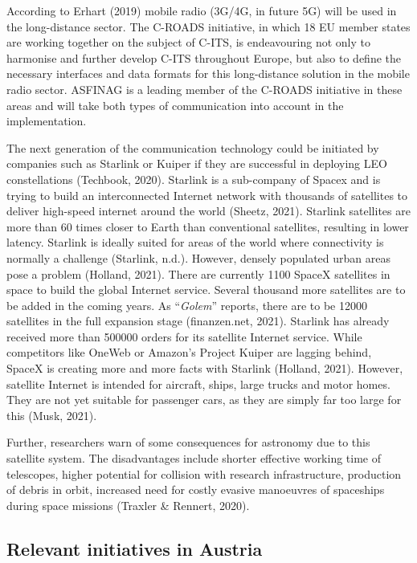 \documentclass[
]{book}
\begin{document}
According to Erhart (2019) mobile radio (3G/4G, in future 5G) will be used in the long-distance sector. The C-ROADS initiative, in which 18 EU member states are working together on the subject of C-ITS, is endeavouring not only to harmonise and further develop C-ITS throughout Europe, but also to define the necessary interfaces and data formats for this long-distance solution in the mobile radio sector. ASFINAG is a leading member of the C-ROADS initiative in these areas and will take both types of communication into account in the implementation.

The next generation of the communication technology could be initiated by companies such as Starlink or Kuiper if they are successful in deploying LEO constellations (Techbook, 2020). Starlink is a sub-company of Spacex and is trying to build an interconnected Internet network with thousands of satellites to deliver high-speed internet around the world (Sheetz, 2021). Starlink satellites are more than 60 times closer to Earth than conventional satellites, resulting in lower latency. Starlink is ideally suited for areas of the world where connectivity is normally a challenge (Starlink, n.d.). However, densely populated urban areas pose a problem (Holland, 2021). There are currently 1100 SpaceX satellites in space to build the global Internet service. Several thousand more satellites are to be added in the coming years. As ``\emph{Golem}'' reports, there are to be 12000 satellites in the full expansion stage (finanzen.net, 2021). Starlink has already received more than 500000 orders for its satellite Internet service. While competitors like OneWeb or Amazon's Project Kuiper are lagging behind, SpaceX is creating more and more facts with Starlink (Holland, 2021). However, satellite Internet is intended for aircraft, ships, large trucks and motor homes. They are not yet suitable for passenger cars, as they are simply far too large for this (Musk, 2021).

Further, researchers warn of some consequences for astronomy due to this satellite system. The disadvantages include shorter effective working time of telescopes, higher potential for collision with research infrastructure, production of debris in orbit, increased need for costly evasive manoeuvres of spaceships during space missions (Traxler \& Rennert, 2020).

\hypertarget{relevant-initiatives-in-austria-41}{%
\subsection*{Relevant initiatives in Austria}\label{relevant-initiatives-in-austria-41}}
\end{document}
